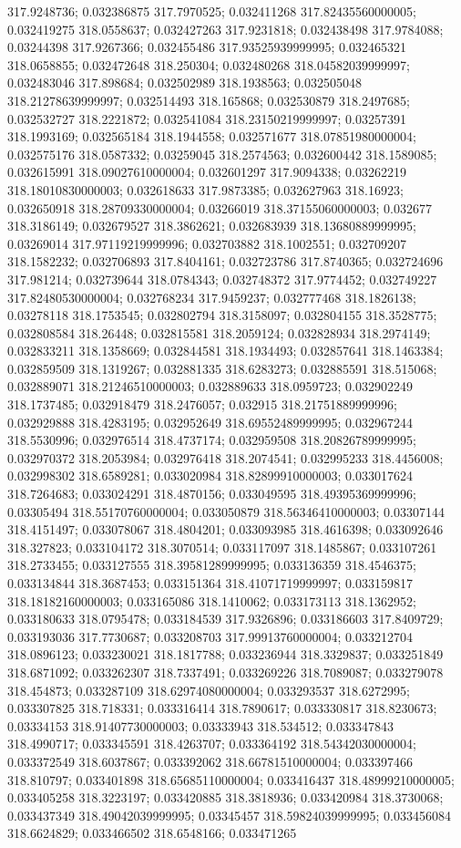 317.9248736; 0.032386875 317.7970525; 0.032411268 317.82435560000005; 0.032419275 318.0558637; 0.032427263 317.9231818; 0.032438498 317.9784088; 0.03244398 317.9267366; 0.032455486 317.93525939999995; 0.032465321 318.0658855; 0.032472648 318.250304; 0.032480268 318.04582039999997; 0.032483046 317.898684; 0.032502989 318.1938563; 0.032505048 318.21278639999997; 0.032514493 318.165868; 0.032530879 318.2497685; 0.032532727 318.2221872; 0.032541084 318.23150219999997; 0.03257391 318.1993169; 0.032565184 318.1944558; 0.032571677 318.07851980000004; 0.032575176 318.0587332; 0.03259045 318.2574563; 0.032600442 318.1589085; 0.032615991 318.09027610000004; 0.032601297 317.9094338; 0.03262219 318.18010830000003; 0.032618633 317.9873385; 0.032627963 318.16923; 0.032650918 318.28709330000004; 0.03266019 318.37155060000003; 0.032677 318.3186149; 0.032679527 318.3862621; 0.032683939 318.13680889999995; 0.03269014 317.97119219999996; 0.032703882 318.1002551; 0.032709207 318.1582232; 0.032706893 317.8404161; 0.032723786 317.8740365; 0.032724696 317.981214; 0.032739644 318.0784343; 0.032748372 317.9774452; 0.032749227 317.82480530000004; 0.032768234 317.9459237; 0.032777468 318.1826138; 0.03278118 318.1753545; 0.032802794 318.3158097; 0.032804155 318.3528775; 0.032808584 318.26448; 0.032815581 318.2059124; 0.032828934 318.2974149; 0.032833211 318.1358669; 0.032844581 318.1934493; 0.032857641 318.1463384; 0.032859509 318.1319267; 0.032881335 318.6283273; 0.032885591 318.515068; 0.032889071 318.21246510000003; 0.032889633 318.0959723; 0.032902249 318.1737485; 0.032918479 318.2476057; 0.032915 318.21751889999996; 0.032929888 318.4283195; 0.032952649 318.69552489999995; 0.032967244 318.5530996; 0.032976514 318.4737174; 0.032959508 318.20826789999995; 0.032970372 318.2053984; 0.032976418 318.2074541; 0.032995233 318.4456008; 0.032998302 318.6589281; 0.033020984 318.82899910000003; 0.033017624 318.7264683; 0.033024291 318.4870156; 0.033049595 318.49395369999996; 0.03305494 318.55170760000004; 0.033050879 318.56346410000003; 0.03307144 318.4151497; 0.033078067 318.4804201; 0.033093985 318.4616398; 0.033092646 318.327823; 0.033104172 318.3070514; 0.033117097 318.1485867; 0.033107261 318.2733455; 0.033127555 318.39581289999995; 0.033136359 318.4546375; 0.033134844 318.3687453; 0.033151364 318.41071719999997; 0.033159817 318.18182160000003; 0.033165086 318.1410062; 0.033173113 318.1362952; 0.033180633 318.0795478; 0.033184539 317.9326896; 0.033186603 317.8409729; 0.033193036 317.7730687; 0.033208703 317.99913760000004; 0.033212704 318.0896123; 0.033230021 318.1817788; 0.033236944 318.3329837; 0.033251849 318.6871092; 0.033262307 318.7337491; 0.033269226 318.7089087; 0.033279078 318.454873; 0.033287109 318.62974080000004; 0.033293537 318.6272995; 0.033307825 318.718331; 0.033316414 318.7890617; 0.033330817 318.8230673; 0.03334153 318.91407730000003; 0.03333943 318.534512; 0.033347843 318.4990717; 0.033345591 318.4263707; 0.033364192 318.54342030000004; 0.033372549 318.6037867; 0.033392062 318.66781510000004; 0.033397466 318.810797; 0.033401898 318.65685110000004; 0.033416437 318.48999210000005; 0.033405258 318.3223197; 0.033420885 318.3818936; 0.033420984 318.3730068; 0.033437349 318.49042039999995; 0.03345457 318.59824039999995; 0.033456084 318.6624829; 0.033466502 318.6548166; 0.033471265 